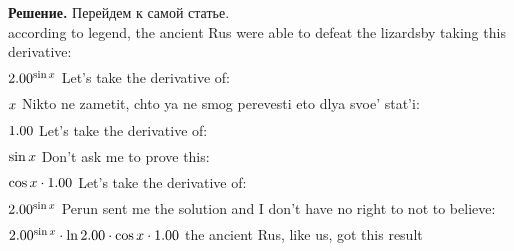 \documentclass[12pt,a4paper]{extreport}
\theoremstyle{plain}
\theoremstyle{definition}
\newenvironment{solution}%
{\par\noindent\textbf{Решение. }}%
{\bigskip}
\begin{document}
\begin{solution}
Перейдем к самой статье. \\
according to legend, the ancient Rus were able to defeat the lizardsby taking this derivative:
\begin{gather}
\end{gather}
\begin{math}
2.00 ^ {\sin x }\\
\end{math}
Let's take the derivative of: 
\begin{gather}
\end{gather}
\begin{math}
x \\
\end{math}
Nikto ne zametit, chto ya ne smog perevesti eto dlya svoe' stat'i: 
\begin{gather}
\end{gather}
\begin{math}
1.00 \\
\end{math}
Let's take the derivative of: 
\begin{gather}
\end{gather}
\begin{math}
\sin x \\
\end{math}
Don't ask me to prove this: 
\begin{gather}
\end{gather}
\begin{math}
\cos x \cdot 1.00 \\
\end{math}
Let's take the derivative of: 
\begin{gather}
\end{gather}
\begin{math}
2.00 ^ {\sin x }\\
\end{math}
Perun sent me the solution and I don't have no right to not to believe: 
\begin{gather}
\end{gather}
\begin{math}
2.00 ^ {\sin x }\cdot \ln 2.00 \cdot \cos x \cdot 1.00 \\
\end{math}
the ancient Rus, like us, got this result


\end{solution}
\end{document}
